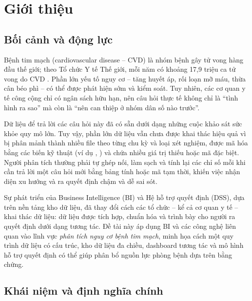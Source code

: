 \chapter{Giới thiệu}

\section{Bối cảnh và động lực}
Bệnh tim mạch (cardiovascular disease -- CVD) là nhóm bệnh gây tử vong hàng đầu thế giới; theo Tổ chức Y tế Thế giới, mỗi năm có khoảng 17,9 triệu ca tử vong do CVD \cite{who_cvd}. Phần lớn yếu tố nguy cơ -- tăng huyết áp, rối loạn mỡ máu, thừa cân béo phì -- có thể được phát hiện sớm và kiểm soát. Tuy nhiên, các cơ quan y tế công cộng chỉ có ngân sách hữu hạn, nên câu hỏi thực tế không chỉ là ``tình hình ra sao'' mà còn là ``nên can thiệp ở nhóm dân số nào trước''.

Dữ liệu để trả lời các câu hỏi này đã có sẵn dưới dạng những cuộc khảo sát sức khỏe quy mô lớn. Tuy vậy, phần lớn dữ liệu vẫn chưa được khai thác hiệu quả vì bị phân mảnh thành nhiều file theo từng chu kỳ và loại xét nghiệm, được mã hóa bằng các biến kỹ thuật (ví dụ , ) và chứa nhiều giá trị thiếu hoặc mã đặc biệt. Người phân tích thường phải tự ghép nối, làm sạch và tính lại các chỉ số mỗi khi cần trả lời một câu hỏi mới bằng bảng tính hoặc mã tạm thời, khiến việc nhận diện xu hướng và ra quyết định chậm và dễ sai sót.

Sự phát triển của Business Intelligence (BI) và Hệ hỗ trợ quyết định (DSS), dựa trên nền tảng kho dữ liệu, đã thay đổi cách các tổ chức -- kể cả cơ quan y tế -- khai thác dữ liệu: dữ liệu được tích hợp, chuẩn hóa và trình bày cho người ra quyết định dưới dạng tương tác. Đề tài này áp dụng BI và các công nghệ liên quan vào lĩnh vực \emph{phân tích nguy cơ bệnh tim mạch}, minh họa cách một quy trình dữ liệu có cấu trúc, kho dữ liệu đa chiều, dashboard tương tác và mô hình hỗ trợ quyết định có thể giúp phân bổ nguồn lực phòng bệnh dựa trên bằng chứng.

\section{Khái niệm và định nghĩa chính}

